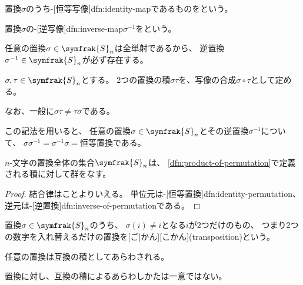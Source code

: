 \documentclass[../sotsu.tex]{subfiles}
\begin{document}
\begin{definition}
    \label{dfn:identity-permutation}
    置換$\sigma$のうち-[恒等写像]{dfn:identity-map}であるものをという。   
\end{definition}

\begin{definition}
    \label{dfn:inverse-of-permutation}
    置換$\sigma$の-[逆写像]{dfn:inverse-map}$\sigma^{-1}$をという。
\end{definition}

任意の置換$\sigma \in \symfrak{S}_n$は全単射であるから、
逆置換$\sigma^{-1} \in \symfrak{S}_n$が必ず存在する。

\begin{definition}[置換の積]
    \label{dfn:product-of-permutation}
    $\sigma, \tau \in \symfrak{S}_n$とする。
    2つの置換の積$\sigma\tau$を、写像の合成$\sigma \circ \tau$として定める。
\end{definition}

なお、一般に$\sigma \tau \neq \tau \sigma$である。

この記法を用いると、
任意の置換$\sigma \in \symfrak{S}_n$とその逆置換$\sigma^{-1}$について、
$\sigma \sigma^{-1} = \sigma^{-1} \sigma = \text{恒等置換}$である。

\begin{proposition}
    $n$-文字の置換全体の集合$\symfrak{S}_n$は、
    \cref{dfn:product-of-permutation}で定義される積に対して群をなす。
\end{proposition}

\begin{proof}
    結合律はことよりいえる。
    単位元は-[恒等置換]{dfn:identity-permutation}、
    逆元は-[逆置換]{dfn:inverse-of-permutation}である。
\end{proof}

\begin{definition}
    \label{dfn:transposition}
    置換$\sigma \in \symfrak{S}_n$のうち、
    $\sigma(i) \neq i$となる$i$が2つだけのもの、
    つまり2つの数字を入れ替えるだけの置換を[ご|かん][こかん](transposition)という。
\end{definition}

\begin{proposition}
    任意の置換は互換の積としてあらわされる。
\end{proposition}

置換に対し、互換の積によるあらわしかたは一意ではない。
\end{document}
